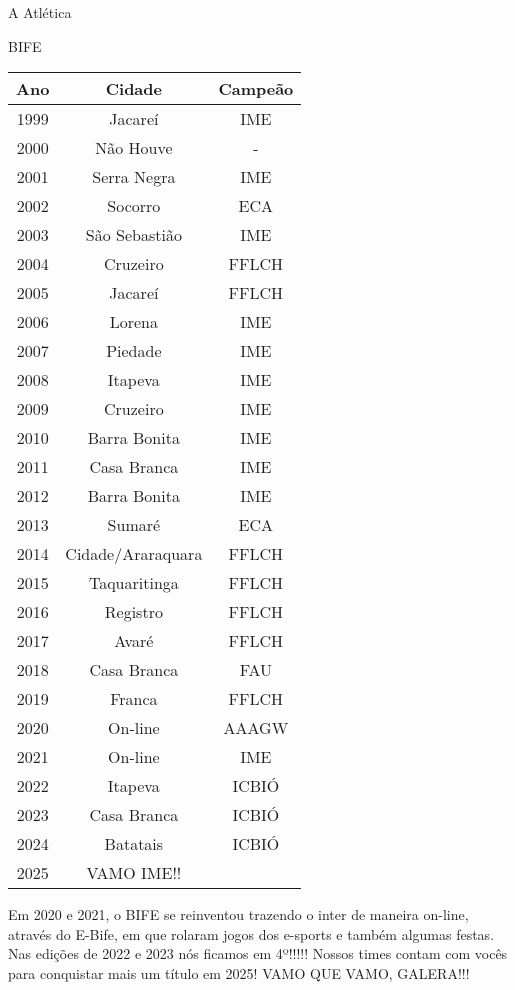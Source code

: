 \begin{secao}{A Atlética}
\begin{subsecao}{BIFE}
\begin{center}
  \begin{tabular}{|c|c|c|}
   \hline
   Ano & Cidade & Campeão\\
   \hline
   1999 & Jacareí & IME\\
   2000 & Não Houve & - \\
   2001 & Serra Negra & IME\\
   2002 & Socorro & ECA\\
   2003 & São Sebastião & IME\\
   2004 & Cruzeiro & FFLCH\\
   2005 & Jacareí & FFLCH\\
   2006 & Lorena & IME\\
   2007 & Piedade & IME\\
   2008 & Itapeva & IME\\
   2009 & Cruzeiro & IME\\
   2010 & Barra Bonita & IME\\
   2011 & Casa Branca & IME\\
   2012 & Barra Bonita & IME\\
   2013 & Sumaré & ECA\\
   2014 & Cidade/Araraquara & FFLCH\\
   2015 & Taquaritinga & FFLCH\\
   2016 & Registro & FFLCH\\
   2017 & Avaré & FFLCH\\
   2018 & Casa Branca & FAU\\
   2019 & Franca & FFLCH\\
   2020 & On-line & AAAGW\\
   2021 & On-line & IME\\
   2022 & Itapeva & ICBIÓ\\
   2023 & Casa Branca & ICBIÓ\\
   2024 & Batatais & ICBIÓ\\
   2025 & VAMO IME!! & \\
   \hline
  \end{tabular}
\end{center}

Em 2020 e 2021, o BIFE se reinventou trazendo o inter de maneira on-line, através do
E-Bife, em que rolaram jogos dos e-sports e também algumas festas. 
Nas edições de 2022 e 2023 nós ficamos em  4º!!!!! Nossos times contam com vocês 
para conquistar mais um título em 2025! VAMO QUE VAMO, GALERA!!!


\end{subsecao}


\end{secao}
